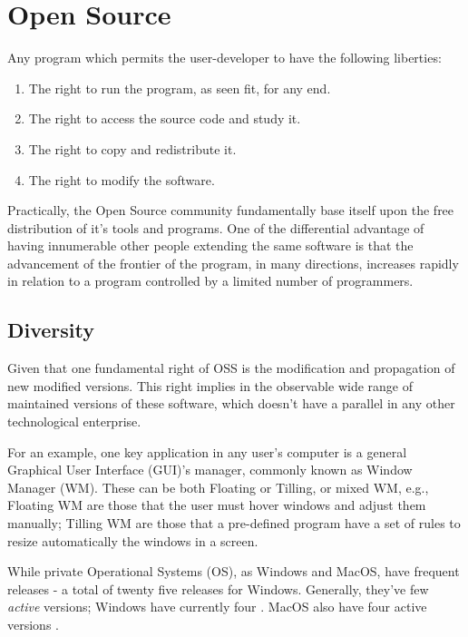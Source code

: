 \documentclass[
12pt,				%
openright,			%
oneside,			%
a4paper,			%
brazil,				%
english,			  %
]{abntex2}
\begin{document}
\section{Open Source}
\label{sec:opensource}

Any program which permits the user-developer to have the following liberties:
\begin{enumerate}
\item The right to run the program, as seen fit, for any end.
\item The right to access the source code and study it.
\item The right to copy and redistribute it.
\item The right to modify the software.
\end{enumerate}

Practically, the Open Source community fundamentally base itself upon
the free distribution of it's tools and programs. One of the differential
advantage of having innumerable other people extending the same
software is that the advancement of the frontier of the program, in
many directions, increases rapidly in relation to a program controlled
by a limited number of programmers.

\subsection{Diversity}
\label{sec:diversity}

Given that one fundamental right of OSS is the modification and
propagation of new modified versions. This right implies in the
observable wide range of maintained versions of these software, which
doesn't have a parallel in any other technological enterprise. 

For an example, one key application in any user's computer is a general
Graphical User Interface (GUI)'s manager, commonly known as Window
Manager (WM). These can be both Floating or Tilling, or mixed WM,
e.g., Floating WM are those that the user must hover windows and
adjust them manually; Tilling WM are those that a pre-defined program
have a set of rules to resize automatically the windows in a screen.

While private Operational Systems (OS), as Windows and MacOS, have
frequent releases - a total of twenty five releases for
Windows. Generally, they've few \textit{active} versions; Windows have
currently four \cite{wikipedia_2021W}. MacOS also have four active
versions \cite{wikipedia_2021Mac}.
\end{document}
